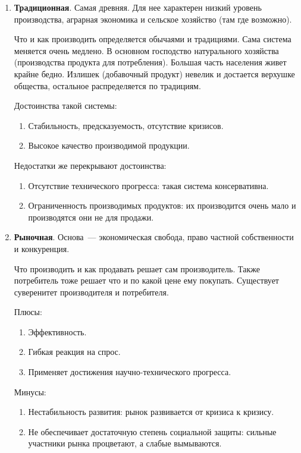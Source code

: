 \documentclass[12pt]{article}
\begin{document}
	\begin{enumerate}
		\item \textbf{Традиционная}. Самая древняя. Для нее характерен низкий уровень производства, аграрная экономика и сельское хозяйство (там где возможно).
		
		Что и как производить определяется обычаями и традициями. Сама система меняется очень медлено. В основном господство натурального хозяйства (производства продукта для потребления). Большая часть населения живет крайне бедно. Излишек (добавочный продукт) невелик и достается верхушке общества, остальное распределяется по традициям.
		
		Достоинства такой системы:
		\begin{enumerate}
			\item Стабильность, предсказуемость, отсутствие кризисов.
			\item Высокое качество производимой продукции.
		\end{enumerate}
		
		Недостатки же перекрывают достоинства:
		\begin{enumerate}
			\item Отсутствие технического прогресса: такая система консервативна.
			\item Ограниченность производимых продуктов: их производится очень мало и производятся они не для продажи.
		\end{enumerate}
		
		\item \textbf{Рыночная}. Основа~--- экономическая свобода, право частной собственности и конкуренция.
		
		Что производить и как продавать решает сам производитель. Также потребитель тоже решает что и по какой цене ему покупать. Существует суверенитет производителя и потребителя. 
		
		Плюсы:
		\begin{enumerate}
			\item Эффективность.
			\item Гибкая реакция на спрос.
			\item Применяет достижения научно-технического прогресса.
		\end{enumerate}
		
		Минусы:
		\begin{enumerate}
			\item Нестабильность развития: рынок развивается от кризиса к кризису.
			\item Не обеспечивает достаточную степень социальной защиты: сильные участники рынка процветают, а слабые вымываются.
		\end{enumerate}
		

\end{enumerate}
\end{document}
